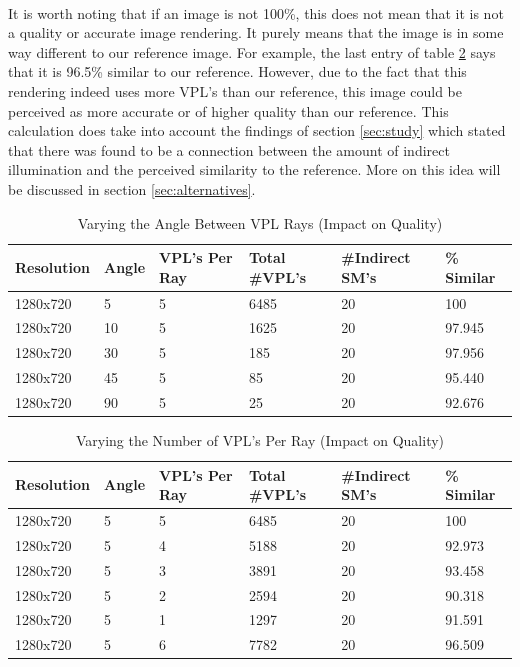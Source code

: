 \paragraph{}
It is worth noting that if an image is not 100\%, this does not mean that it is not a quality or accurate image rendering.  It purely means that the image is in some way different to our reference image.  For example, the last entry of table \ref{table:5.6} says that it is 96.5\% similar to our reference.  However, due to the fact that this rendering indeed uses more VPL's than our reference, this image could be perceived as more accurate or of higher quality than our reference.  This calculation does take into account the findings of section \ref{sec:study} which stated that there was found to be a connection between the amount of indirect illumination and the perceived similarity to the reference.  More on this idea will be discussed in section \ref{sec:alternatives}.
\begin{table}[h!]
	\caption{Varying the Angle Between VPL Rays (Impact on Quality)}
	\begin{center}
	    \begin{tabular}{ | l | l | l | l | l | l |}
	    \hline
	    Resolution & Angle & VPL's Per Ray & Total \#VPL's & \#Indirect SM's & \% Similar\\ \hline
	    1280x720 & 5 & 5 & 6485 & 20 & 100\\ \hline
	    1280x720 & 10 & 5 & 1625 & 20 & 97.945\\ \hline
	    1280x720 & 30 & 5 & 185 & 20 & 97.956\\ \hline
	    1280x720 & 45 & 5 & 85 & 20 & 95.440\\ \hline
	    1280x720 & 90 & 5 & 25 & 20 & 92.676\\ \hline
	    \end{tabular}
	\end{center}
	\label{table:5.5}
\end{table}
\begin{table}[h!]
	\caption{Varying the Number of VPL's Per Ray (Impact on Quality)}
	\begin{center}
	    \begin{tabular}{ | l | l | l | l | l | l |}
	    \hline
	    Resolution & Angle & VPL's Per Ray & Total \#VPL's & \#Indirect SM's & \% Similar\\ \hline
	    1280x720 & 5 & 5 & 6485 & 20 & 100\\ \hline
	    1280x720 & 5 & 4 & 5188 & 20 & 92.973\\ \hline
	    1280x720 & 5 & 3 & 3891 & 20 & 93.458\\ \hline
	    1280x720 & 5 & 2 & 2594 & 20 & 90.318\\ \hline
	    1280x720 & 5 & 1 & 1297 & 20 & 91.591\\ \hline
	    1280x720 & 5 & 6 & 7782 & 20 & 96.509\\ \hline
	    \end{tabular}
	\end{center}
	\label{table:5.6}
\end{table}
